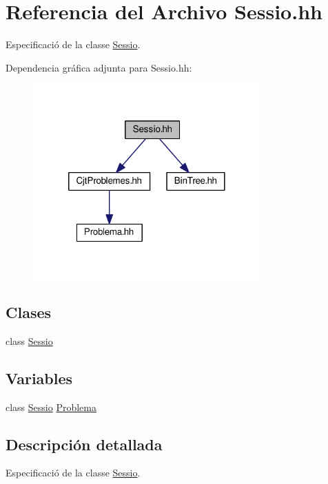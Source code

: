 \hypertarget{_sessio_8hh}{}\section{Referencia del Archivo Sessio.\+hh}
\label{_sessio_8hh}


Especificació de la classe \mbox{\hyperlink{class_sessio}{Sessio}}.  


Dependencia gráfica adjunta para Sessio.\+hh\+:
\nopagebreak
\begin{figure}[H]
\begin{center}
\leavevmode
\includegraphics[width=248pt]{_sessio_8hh__incl}
\end{center}
\end{figure}
\subsection*{Clases}
\begin{DoxyCompactItemize}
\item 
class \mbox{\hyperlink{class_sessio}{Sessio}}
\end{DoxyCompactItemize}
\subsection*{Variables}
\begin{DoxyCompactItemize}
\item 
class \mbox{\hyperlink{class_sessio}{Sessio}} \mbox{\hyperlink{_sessio_8hh_a2fec61464f4d0b831e76553fca0c62bf}{Problema}}
\end{DoxyCompactItemize}


\subsection{Descripción detallada}
Especificació de la classe \mbox{\hyperlink{class_sessio}{Sessio}}. 



